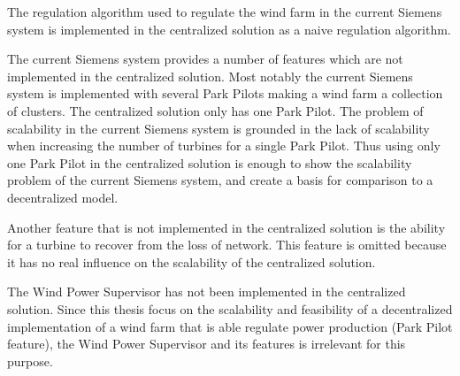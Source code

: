 The regulation algorithm used to regulate the wind farm in the current Siemens system is implemented in the centralized solution as a naive regulation algorithm.

The current Siemens system provides a number of features which are not implemented in the centralized solution. Most notably the current Siemens system is implemented with several Park Pilots making a wind farm a collection of clusters. The centralized solution only has one Park Pilot. The problem of scalability in the current Siemens system is grounded in the lack of scalability when increasing the number of turbines for a single Park Pilot. Thus using only one Park Pilot in the centralized solution is enough to show the scalability problem of the current Siemens system, and create a basis for comparison to a decentralized model.

Another feature that is not implemented in the centralized solution is the ability for a turbine to recover from the loss of network. This feature is omitted because it has no real influence on the scalability of the centralized solution.

The Wind Power Supervisor has not been implemented in the centralized solution. Since this thesis focus on the scalability and feasibility of a decentralized implementation of a wind farm that is able regulate power production (Park Pilot feature), the Wind Power Supervisor and its features is irrelevant for this purpose.